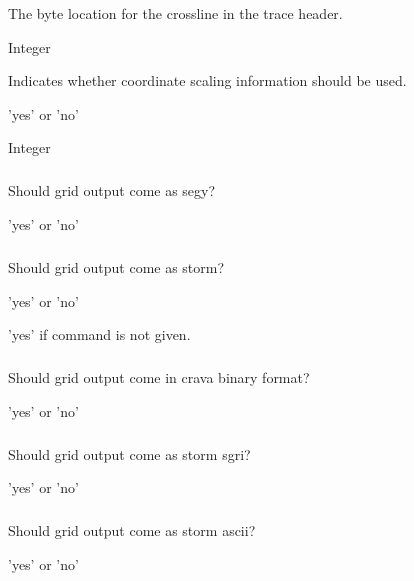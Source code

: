  \slist
   \item \Description The byte location for the crossline in the trace header.
   \item \Argument Integer
   \item \Default
 \elist

 \slist
   \item \Description Indicates whether coordinate scaling information should be used.
   \item \Argument 'yes' or 'no'
   \item \Default
 \elist

 \slist
   \item \Description
   \item \Argument Integer
   \item \Default
 \elist

\subparagraph{}
 \slist
   \item \Description Should grid output come as segy?
   \item \Argument 'yes' or 'no'
   \item \Default
 \elist

\subparagraph{}
 \slist
   \item \Description Should grid output come as storm?
   \item \Argument 'yes' or 'no'
   \item \Default 'yes' if  command is not given.
 \elist


\subparagraph{}
 \slist
   \item \Description Should grid output come in crava binary format?
   \item \Argument 'yes' or 'no'
   \item \Default
 \elist

\subparagraph{}
 \slist
   \item \Description Should grid output come as storm sgri?
   \item \Argument 'yes' or 'no'
   \item \Default
 \elist

\subparagraph{}
 \slist
   \item \Description Should grid output come as storm ascii?
   \item \Argument 'yes' or 'no'
   \item \Default
 \elist

